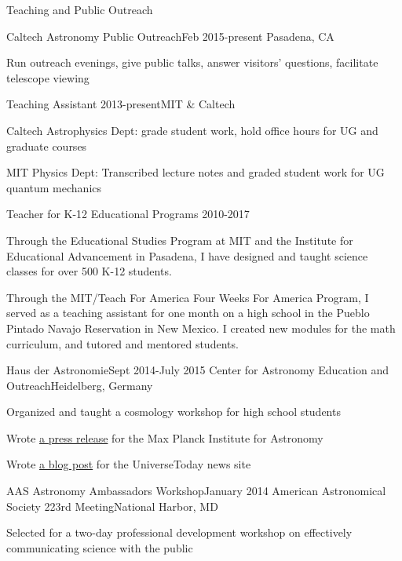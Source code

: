 \documentclass{resume} %
\begin{document}
\begin{rSection}{Teaching and Public Outreach}

  \begin{rSubsection}{Caltech Astronomy Public Outreach}{Feb 2015-present}
    {}{Pasadena, CA}
  \item Run outreach evenings, give public talks, answer visitors' questions,
    facilitate telescope viewing
  \end{rSubsection}

  \begin{rSubsection}{Teaching Assistant} 
    {2013-present}{}{MIT \& Caltech}
  \item Caltech Astrophysics Dept: grade student work, hold office hours 
    for UG and graduate courses
  \item MIT Physics Dept: Transcribed lecture notes and graded student work
    for UG quantum mechanics
  \end{rSubsection}

  \begin{rSubsection}{Teacher for K-12 Educational Programs}
    {2010-2017}{}{}
  \item Through the Educational Studies Program at MIT and the 
    Institute for Educational Advancement in Pasadena, 
    I have designed and taught science
    classes for over 500 K-12 students.
  \item Through the MIT/Teach For America Four Weeks For America Program,
    I served as a teaching assistant for one month on a high school in
    the Pueblo Pintado Navajo Reservation in New Mexico. I created
    new modules for the math curriculum, and tutored and mentored students.
  \end{rSubsection}

  \begin{rSubsection}
    {Haus der Astronomie}{Sept 2014-July 2015}
    {Center for Astronomy Education and Outreach}{Heidelberg, Germany}
  \item Organized and taught a cosmology workshop for high school students
  \item Wrote \href{http://www.mpia.de/news/science/2015-03-biosignatures}
    {a press release} for the Max Planck Institute for Astronomy
  \item Wrote \href{http://www.universetoday.com/120820/distant-stellar-nurseries-this-time-in-high-definition/}
    {a blog post} for the UniverseToday news site
  \end{rSubsection}

  \begin{rSubsection}{AAS Astronomy Ambassadors Workshop}{January 2014}
  {American Astronomical Society 223rd Meeting}{National Harbor, MD}
  \item Selected for a two-day professional development workshop on
    effectively communicating science with the public
  \end{rSubsection}


\end{rSection}
\end{document}
